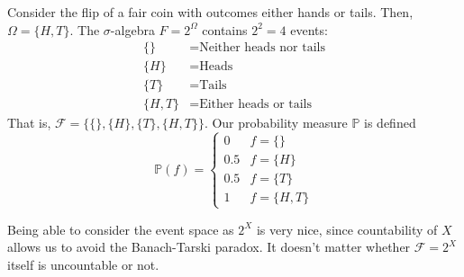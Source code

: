     \begin{example}
      Consider the flip of a fair coin with outcomes either hands or tails. Then, $\Omega = \{H, T\}$. The $\sigma$-algebra $F = 2^{\Omega}$ contains $2^2 = 4$ events: 
      \begin{align*}
        \{\} &= \text{Neither heads nor tails} \\
        \{H\} &= \text{Heads} \\
        \{T\} &= \text{Tails} \\
        \{H, T\} &= \text{Either heads or tails}
      \end{align*}
      That is, $\mathcal{F} = \{\{\}, \{H\}, \{T\}, \{H, T\}\}$. Our probability measure $\mathbb{P}$ is defined
      \begin{equation}
        \mathbb{P}(f) = \begin{cases}
        0 & f = \{\} \\
        0.5 & f = \{H\} \\
        0.5 & f = \{T\} \\
        1 & f = \{H, T\}
        \end{cases}
      \end{equation}
    \end{example}

    Being able to consider the event space as $2^X$ is very nice, since countability of $X$ allows us to avoid the Banach-Tarski paradox. It doesn't matter whether $\mathcal{F} = 2^X$ itself is uncountable or not. 

